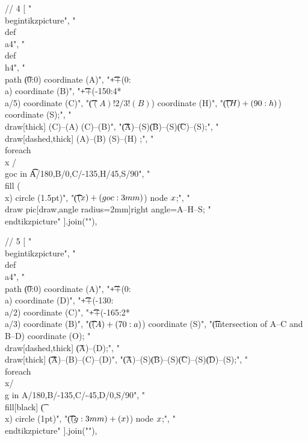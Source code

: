 // 4
[
"\\begin{tikzpicture}",
"\t\\def\\a{4}",
"\t\\def\\h{4}",
"\t\\path \t(0:0) coordinate (A)",
"\t\t\t++(0:\\a) coordinate (B)",
"\t\t\t++(-150:4*\\a/5) coordinate (C)",
"\t\t\t($(A)!2/3!(B)$) coordinate (H)",
"\t\t\t($(H)+(90:\\h)$) coordinate (S);",
"\t\\draw[thick] (C)--(A) (C)--(B)",
"\t\t\t(A)--(S)\t(B)--(S)\t(C)--(S);",
"\t\\draw[dashed,thick] (A)--(B) (S)--(H) ;",
"\t\\foreach \\x / \\goc in \t\t{A/180,B/0,C/-135,H/45,S/90}",
"\t\t\t\\fill (\\x) circle (1.5pt)",
"\t\t\t($(\\x)+(\\goc:3mm)$) node {$\\x$};",
"\t\\draw pic[draw,angle radius=2mm]{right angle=A--H--S};%
"\\end{tikzpicture}"
].join("\n"),

// 5
[
"\\begin{tikzpicture}",
"\t\\def\\a{4}",
"\t\\path \t(0:0) coordinate (A)",
"\t\t\t++(0:\\a) coordinate (D)",
"\t\t\t++(-130:\\a/2) coordinate (C)",
"\t\t\t++(-165:2*\\a/3) coordinate (B)",
"\t\t\t($(A)+(70:\\a)$) coordinate (S)",
"\t\t\t(intersection of A--C and B--D) coordinate (O);%
"\t\\draw[dashed,thick] \t(A)--(D);",
"\t\\draw[thick] \t\t\t(A)--(B)--(C)--(D)",
"\t(A)--(S)\t(B)--(S)\t(C)--(S)\t(D)--(S);",
"\t\\foreach \\x/\\g in {A/180,B/-135,C/-45,D/0,S/90}",
"\t\t\t\\fill[black] \t(\\x) circle (1pt)",
"\t\t\t($(\\g:3mm)+(\\x)$) node {$\\x$};",
"\\end{tikzpicture}"
].join("\n"),

